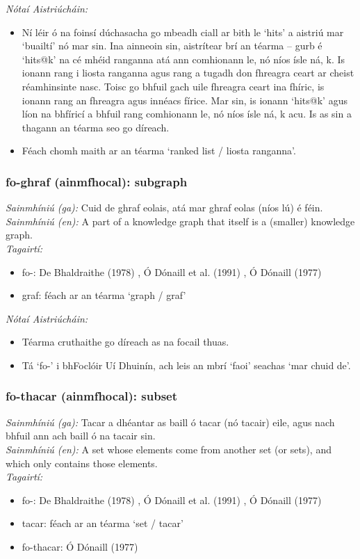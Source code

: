 \noindent \textit{Nótaí Aistriúcháin:}
\begin{itemize}
	\item Ní léir ó na foinsí dúchasacha go mbeadh ciall ar bith le `hits' a aistriú mar `buailtí' nó mar sin. Ina ainneoin sin, aistrítear brí an téarma -- gurb é `hits@k' na cé mhéid ranganna atá ann comhionann le, nó níos ísle ná, k. Is ionann rang i liosta ranganna agus rang a tugadh don fhreagra ceart ar cheist réamhinsinte nasc. Toisc go bhfuil gach uile fhreagra ceart ina fhíric, is ionann rang an fhreagra agus innéacs fírice. Mar sin, is ionann `hits@k' agus líon na bhfíricí a bhfuil rang comhionann le, nó níos ísle ná, k acu. Is as sin a thagann an téarma seo go díreach.
	\item Féach chomh maith ar an téarma `ranked list / liosta ranganna'.
\end{itemize}


\subsubsection*{fo-ghraf (ainmfhocal): subgraph}
 \noindent \textit{Sainmhíniú (ga):} Cuid de ghraf eolais, atá mar ghraf eolas (níos lú) é féin.
\\
 \noindent \textit{Sainmhíniú (en):} A part of a knowledge graph that itself is a (smaller) knowledge graph.
\\
 \noindent \textit{Tagairtí:}
\begin{itemize}
	\item fo-: De Bhaldraithe (1978) \cite{de-bhaldraithe}, Ó Dónaill et al. (1991) \cite{focloir-beag}, Ó Dónaill (1977) \cite{odonaill}
	\item graf: féach ar an téarma `graph / graf'
\end{itemize}

 \noindent \textit{Nótaí Aistriúcháin:}
\begin{itemize}
	\item Téarma cruthaithe go díreach as na focail thuas.
	\item Tá `fo-' i bhFoclóir Uí Dhuinín, ach leis an mbrí `faoi' seachas `mar chuid de'.
\end{itemize}


\subsubsection*{fo-thacar (ainmfhocal): subset}
 \noindent \textit{Sainmhíniú (ga):} Tacar a dhéantar as baill ó tacar (nó tacair) eile, agus nach bhfuil ann ach baill ó na tacair sin.
\\
 \noindent \textit{Sainmhíniú (en):} A set whose elements come from another set (or sets), and which only contains those elements.
\\
 \noindent \textit{Tagairtí:}
\begin{itemize}
	\item fo-: De Bhaldraithe (1978) \cite{de-bhaldraithe}, Ó Dónaill et al. (1991) \cite{focloir-beag}, Ó Dónaill (1977) \cite{odonaill}
	\item tacar: féach ar an téarma `set / tacar'
	\item fo-thacar: Ó Dónaill (1977) \cite{odonaill}
\end{itemize}


